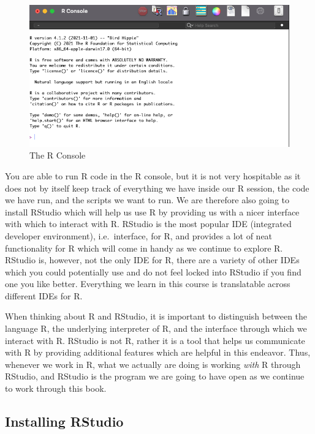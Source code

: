 \documentclass[
]{book}
\begin{document}
\begin{figure}
\centering
\includegraphics{figures/console.png}
\caption{The R Console}
\end{figure}

You are able to run R code in the R console, but it is not very hospitable as it does not by itself keep track of everything we have inside our R session, the code we have run, and the scripts we want to run. We are therefore also going to install RStudio which will help us use R by providing us with a nicer interface with which to interact with R. RStudio is the most popular IDE (integrated developer environment), i.e.~interface, for R, and provides a lot of neat functionality for R which will come in handy as we continue to explore R. RStudio is, however, not the only IDE for R, there are a variety of other IDEs which you could potentially use and do not feel locked into RStudio if you find one you like better. Everything we learn in this course is translatable across different IDEs for R.

When thinking about R and RStudio, it is important to distinguish between the language R, the underlying interpreter of R, and the interface through which we interact with R. RStudio is not R, rather it is a tool that helps us communicate with R by providing additional features which are helpful in this endeavor. Thus, whenever we work in R, what we actually are doing is working \emph{with} R through RStudio, and RStudio is the program we are going to have open as we continue to work through this book.

\hypertarget{installing-rstudio}{%
\subsection{Installing RStudio}\label{installing-rstudio}}
\end{document}
